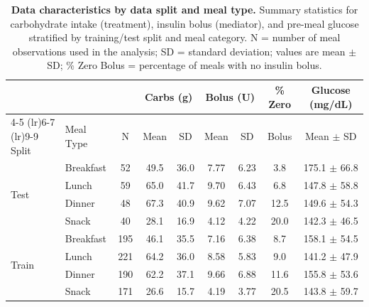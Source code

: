 \begin{table}[ht]
\centering
\small
\caption{\textbf{Data characteristics by data split and meal type.}
Summary statistics for carbohydrate intake (treatment), insulin bolus (mediator),
and pre-meal glucose stratified by training/test split and meal category.
N = number of meal observations used in the analysis; SD = standard deviation; values are mean $\pm$ SD;
\% Zero Bolus = percentage of meals with no insulin bolus.}
\label{tab:split_meal_summary}
\begin{tabular}{llccccccc}
\toprule
& & & \multicolumn{2}{c}{Carbs (g)} & \multicolumn{2}{c}{Bolus (U)} & \% Zero & Glucose (mg/dL) \\
\cmidrule(lr){4-5} \cmidrule(lr){6-7} \cmidrule(lr){9-9}
Split & Meal Type & N & Mean & SD & Mean & SD & Bolus & Mean $\pm$ SD \\
\midrule
\multirow{4}{*}{Test} & Breakfast & 52 & 49.5 & 36.0 & 7.77 & 6.23 & 3.8 & 175.1 $\pm$ 66.8 \\
 & Lunch & 59 & 65.0 & 41.7 & 9.70 & 6.43 & 6.8 & 147.8 $\pm$ 58.8 \\
 & Dinner & 48 & 67.3 & 40.9 & 9.62 & 7.07 & 12.5 & 149.6 $\pm$ 54.3 \\
 & Snack & 40 & 28.1 & 16.9 & 4.12 & 4.22 & 20.0 & 142.3 $\pm$ 46.5 \\
\midrule
\multirow{4}{*}{Train} & Breakfast & 195 & 46.1 & 35.5 & 7.16 & 6.38 & 8.7 & 158.1 $\pm$ 54.5 \\
 & Lunch & 221 & 64.2 & 36.0 & 8.58 & 5.83 & 9.0 & 141.2 $\pm$ 47.9 \\
 & Dinner & 190 & 62.2 & 37.1 & 9.66 & 6.88 & 11.6 & 155.8 $\pm$ 53.6 \\
 & Snack & 171 & 26.6 & 15.7 & 4.19 & 3.77 & 20.5 & 143.8 $\pm$ 59.7 \\
\bottomrule
\end{tabular}
\end{table}
